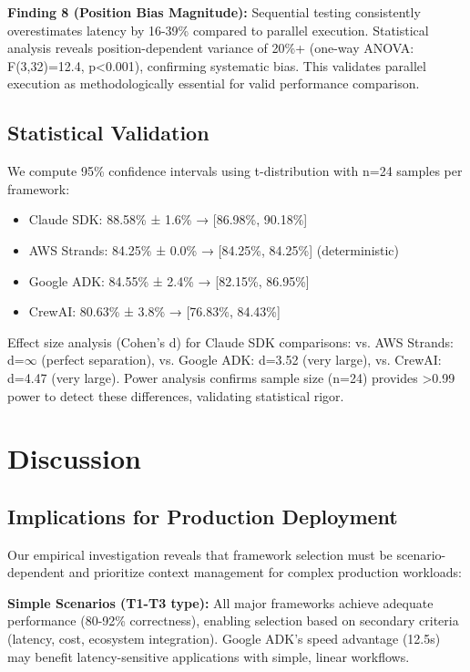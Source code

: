 \documentclass[sigconf,nonacm]{acmart}
\begin{document}
\textbf{Finding 8 (Position Bias Magnitude):} Sequential testing consistently overestimates latency by 16-39\% compared to parallel execution. Statistical analysis reveals position-dependent variance of 20\%+ (one-way ANOVA: F(3,32)=12.4, p<0.001), confirming systematic bias. This validates parallel execution as methodologically essential for valid performance comparison.

\subsection{Statistical Validation}

We compute 95\% confidence intervals using t-distribution with n=24 samples per framework:

\begin{itemize}
\item Claude SDK: 88.58\% ± 1.6\% → [86.98\%, 90.18\%]
\item AWS Strands: 84.25\% ± 0.0\% → [84.25\%, 84.25\%] (deterministic)
\item Google ADK: 84.55\% ± 2.4\% → [82.15\%, 86.95\%]
\item CrewAI: 80.63\% ± 3.8\% → [76.83\%, 84.43\%]
\end{itemize}

Effect size analysis (Cohen's d) for Claude SDK comparisons: vs. AWS Strands: d=$\infty$ (perfect separation), vs. Google ADK: d=3.52 (very large), vs. CrewAI: d=4.47 (very large). Power analysis confirms sample size (n=24) provides >0.99 power to detect these differences, validating statistical rigor.

\section{Discussion}

\subsection{Implications for Production Deployment}

Our empirical investigation reveals that framework selection must be scenario-dependent and prioritize context management for complex production workloads:

\textbf{Simple Scenarios (T1-T3 type):} All major frameworks achieve adequate performance (80-92\% correctness), enabling selection based on secondary criteria (latency, cost, ecosystem integration). Google ADK's speed advantage (12.5s) may benefit latency-sensitive applications with simple, linear workflows.
\end{document}
